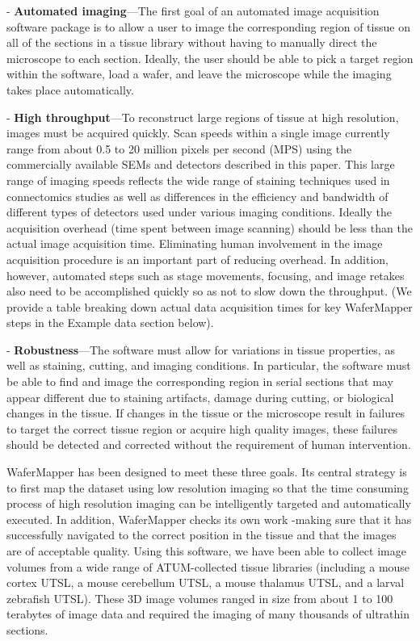 \documentclass{article}
\begin{document}
\begin{hangpars}
- \textbf{Automated imaging}—The first goal of an automated image acquisition software package is to allow a user to image the corresponding region of tissue on all of the sections in a tissue library without having to manually direct the microscope to each section. Ideally, the user should be able to pick a target region within the software, load a wafer, and leave the microscope while the imaging takes place automatically.

- \textbf{High throughput}—To reconstruct large regions of tissue at high resolution, images must be acquired quickly. Scan speeds within a single image currently range from about 0.5 to 20 million pixels per second (MPS) using the commercially available SEMs and detectors described in this paper. This large range of imaging speeds reflects the wide range of staining techniques used in connectomics studies as well as differences in the efficiency and bandwidth of different types of detectors used under various imaging conditions. Ideally the acquisition overhead (time spent between image scanning) should be less than the actual image acquisition time. Eliminating human involvement in the image acquisition procedure is an important part of reducing overhead. In addition, however, automated steps such as stage movements, focusing, and image retakes also need to be accomplished quickly so as not to slow down the throughput. (We provide a table breaking down actual data acquisition times for key WaferMapper steps in the Example data section below).

- \textbf{Robustness}—The software must allow for variations in tissue properties, as well as staining, cutting, and imaging conditions. In particular, the software must be able to find and image the corresponding region in serial sections that may appear different due to staining artifacts, damage during cutting, or biological changes in the tissue. If changes in the tissue or the microscope result in failures to target the correct tissue region or acquire high quality images, these failures should be detected and corrected without the requirement of human intervention.
\end{hangpars}

\noindent WaferMapper has been designed to meet these three goals. Its central strategy is to first map the dataset using low resolution imaging so that the time consuming process of high resolution imaging can be intelligently targeted and automatically executed. In addition, WaferMapper checks its own work -making sure that it has successfully navigated to the correct position in the tissue and that the images are of acceptable quality. Using this software, we have been able to collect image volumes from a wide range of ATUM-collected tissue libraries (including a mouse cortex UTSL, a mouse cerebellum UTSL, a mouse thalamus UTSL, and a larval zebrafish UTSL). These 3D image volumes ranged in size from about 1 to 100 terabytes of image data and required the imaging of many thousands of ultrathin sections.
\end{document}
